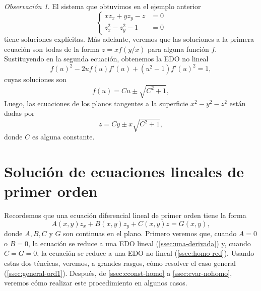 \documentclass[11pt,letterpaper,draft]{report}
\theoremstyle{plain}
\theoremstyle{definition}
\theoremstyle{remark}
\newtheorem{remark}[theorem]{Observación}
\newcommand\<{\langle}
\renewcommand\>{\rangle}
\begin{document}
\begin{remark}
  El sistema que obtuvimos en el ejemplo anterior
  \begin{equation}
    \left\{
      \begin{aligned}
        xz_x + yz_y - z &= 0 \\
        z_x^{2} - z_y^{2} - 1 &= 0 
      \end{aligned}
    \right.
  \end{equation}
  tiene soluciones explícitas.
  Más adelante, veremos que las soluciones a la primera ecuación son
  todas de la forma \(z = xf(y / x)\) para alguna función \(f\).
  Sustituyendo en la segunda ecuación, obtenemos la EDO no lineal
  \begin{equation}
    f(u)^{2}-2uf(u)f'(u) + (u^{2}-1)f'(u)^{2} = 1
  ,\end{equation}
  cuyas soluciones son
  \begin{equation}
    f(u) = Cu \pm \sqrt{C^{2}+1}
  ,\end{equation}
  Luego, las ecuaciones de los planos tangentes a la superficie
  \(x^{2}-y^{2}-z^{2}\) están dadas por
  \begin{equation}
    z = Cy \pm x\sqrt{C^{2}+1}
  ,\end{equation}
  donde \(C\) es alguna constante.
\end{remark}

\section{Solución de ecuaciones lineales de primer orden}

Recordemos que una ecuación diferencial lineal de primer orden tiene
la forma
\begin{equation}
  \label{eqn:ed_lineal_1orden}
  A(x,y) z_x + B(x,y) z_y + C(x,y) z = G(x,y),
\end{equation}
donde $A,B,C$ y $G$ son continuas en el plano.
Primero veremos que, cuando \(A=0\) o \(B=0\), la ecuación se reduce a
una EDO lineal (\ref{ssec:una-derivada}) y,
cuando \(C=G=0\), la ecuación se reduce a una EDO no lineal
(\ref{ssec:homo-red}).
Usando estas dos téncicas, veremos, a grandes rasgos,
cómo resolver el caso general (\ref{ssec:general-ord1}).
Después, de \ref{ssec:cconst-homo} a \ref{ssec:cvar-nohomo}, veremos
cómo realizar este procedimiento en algunos casos.
\end{document}
